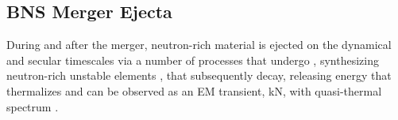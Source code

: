 
\subsection{\ac{BNS} Merger Ejecta}





During and after the merger, neutron-rich material is ejected on the 
dynamical \citep{Rosswog:1998hy,Hotokezaka:2013b,Bauswein:2013yna,Wanajo:2014wha,Radice:2018pdn} 
and secular \citep{Lee:2009,Perego:2014fma,Fernandez:2015use,Siegel:2017nub,Fujibayashi:2017puw,Fernandez:2018kax,Miller:2019dpt} 
timescales via a number of processes %
that 
undergo \rproc{} \nuc{}, synthesizing neutron-rich unstable elements 
\citep{Eichler:1989ve,Wanajo:2014wha,Cowan:2019pkx},
that subsequently decay, releasing energy that thermalizes and can be observed as 
an \ac{EM} transient, \ac{kN}, with quasi-thermal spectrum \citep{Metzger:2019zeh}. 
%

